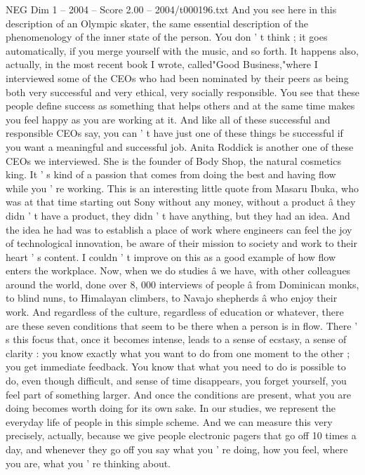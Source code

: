 \begin{textsample}{NEG Dim 1 – 2004 – Score 2.00 – 2004/t000196.txt}
And you see here in this description of an Olympic skater, the same essential description of the phenomenology of the inner state of the person.
You don ' t think ; it goes automatically, if you merge yourself with the music, and so forth.
It happens also, actually, in the most recent book I wrote, called"Good Business,"where I interviewed some of the CEOs who had been nominated by their peers as being both very successful and very ethical, very socially responsible.
You see that these people define success as something that helps others and at the same time makes you feel happy as you are working at it.
And like all of these successful and responsible CEOs say, you can ' t have just one of these things be successful if you want a meaningful and successful job.
Anita Roddick is another one of these CEOs we interviewed.
She is the founder of Body Shop, the natural cosmetics king.
It ' s kind of a passion that comes from doing the best and having flow while you ' re working.
This is an interesting little quote from Masaru Ibuka, who was at that time starting out Sony without any money, without a product â they didn ' t have a product, they didn ' t have anything, but they had an idea.
And the idea he had was to establish a place of work where engineers can feel the joy of technological innovation, be aware of their mission to society and work to their heart ' s content.
I couldn ' t improve on this as a good example of how flow enters the workplace.
Now, when we do studies â we have, with other colleagues around the world, done over 8, 000 interviews of people â from Dominican monks, to blind nuns, to Himalayan climbers, to Navajo shepherds â who enjoy their work.
And regardless of the culture, regardless of education or whatever, there are these seven conditions that seem to be there when a person is in flow.
There ' s this focus that, once it becomes intense, leads to a sense of ecstasy, a sense of clarity : you know exactly what you want to do from one moment to the other ; you get immediate feedback.
You know that what you need to do is possible to do, even though difficult, and sense of time disappears, you forget yourself, you feel part of something larger.
And once the conditions are present, what you are doing becomes worth doing for its own sake.
In our studies, we represent the everyday life of people in this simple scheme.
And we can measure this very precisely, actually, because we give people electronic pagers that go off 10 times a day, and whenever they go off you say what you ' re doing, how you feel, where you are, what you ' re thinking about.

\end{textsample}
